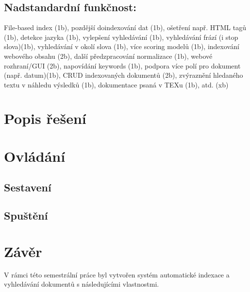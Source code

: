 \documentclass[12pt, a4paper]{article}
\begin{document}
\subsection{Nadstandardní funkčnost:}

File-based index (1b), pozdější doindexování dat (1b), ošetření např. HTML tagů (1b), detekce jazyka (1b), vylepšení vyhledávání (1b), vyhledávání frází (i stop slova)(1b), vyhledávání v okolí slova (1b), více scoring modelů (1b),  indexování webového obsahu (2b), další předzpracování normalizace (1b), webové rozhraní/GUI (2b), napovídání keywords (1b), podpora více polí pro dokument (např. datum)(1b), CRUD indexovaných dokumentů (2b), zvýraznění hledaného textu v náhledu výsledků (1b), dokumentace psaná v TEXu (1b), atd. (xb)


\newpage

\section{Popis řešení}


\section{Ovládání}

\subsection{Sestavení}


\subsection{Spuštění}


\section{Závěr}

V rámci této semestrální práce byl vytvořen systém automatické indexace a vyhledávání dokumentů s následujícími vlastnostmi.
\end{document}

